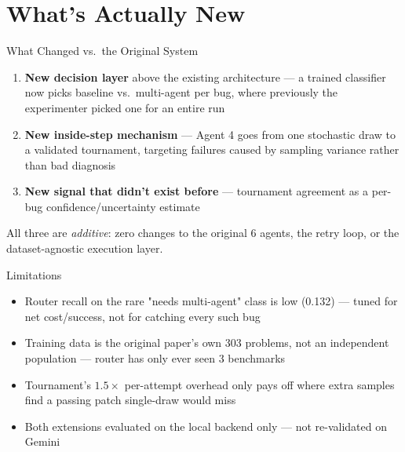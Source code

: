\documentclass[aspectratio=169]{beamer}
\begin{document}
\section{What's Actually New}
\begin{frame}{What Changed vs.\ the Original System}
\begin{enumerate}
    \item \textbf{New decision layer} above the existing architecture --- a trained classifier now picks baseline vs.\ multi-agent per bug, where previously the experimenter picked one for an entire run
    \item \textbf{New inside-step mechanism} --- Agent 4 goes from one stochastic draw to a validated tournament, targeting failures caused by sampling variance rather than bad diagnosis
    \item \textbf{New signal that didn't exist before} --- tournament agreement as a per-bug confidence/uncertainty estimate
\end{enumerate}
\vspace{8pt}
All three are \emph{additive}: zero changes to the original 6 agents, the retry loop, or the dataset-agnostic execution layer.
\end{frame}

\begin{frame}{Limitations}
\begin{itemize}
    \item Router recall on the rare "needs multi-agent" class is low (0.132) --- tuned for net cost/success, not for catching every such bug
    \item Training data is the original paper's own 303 problems, not an independent population --- router has only ever seen 3 benchmarks
    \item Tournament's $1.5\times$ per-attempt overhead only pays off where extra samples find a passing patch single-draw would miss
    \item Both extensions evaluated on the local backend only --- not re-validated on Gemini
\end{itemize}
\end{frame}
\end{document}
